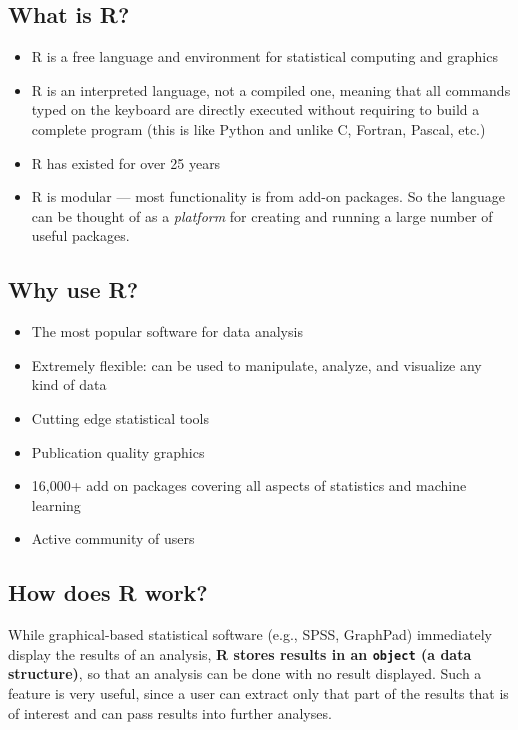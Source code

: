\documentclass[
]{book}
\providecommand{\tightlist}{%
  \setlength{\itemsep}{0pt}\setlength{\parskip}{0pt}}
\begin{document}
\hypertarget{what-is-r}{%
\subsection{What is R?}\label{what-is-r}}

\begin{itemize}
\tightlist
\item
  R is a free language and environment for statistical computing and graphics
\item
  R is an interpreted language, not a compiled one, meaning that all commands typed on the keyboard are directly executed without requiring to build a complete program (this is like Python and unlike C, Fortran, Pascal, etc.)
\item
  R has existed for over 25 years
\item
  R is modular --- most functionality is from add-on packages. So the language can be thought of as a \emph{platform} for creating and running a large number of useful packages.
\end{itemize}

\hypertarget{why-use-r}{%
\subsection{Why use R?}\label{why-use-r}}

\begin{itemize}
\tightlist
\item
  The most popular software for data analysis
\item
  Extremely flexible: can be used to manipulate, analyze, and visualize any kind of data
\item
  Cutting edge statistical tools
\item
  Publication quality graphics
\item
  16,000+ add on packages covering all aspects of statistics and machine learning
\item
  Active community of users
\end{itemize}

\hypertarget{how-does-r-work}{%
\subsection{How does R work?}\label{how-does-r-work}}

While graphical-based statistical software (e.g., SPSS, GraphPad) immediately display the results of an analysis, \textbf{R stores results in an \texttt{object} (a data structure)}, so that an analysis can be done with no result displayed. Such a feature is very useful, since a user can extract only that part of the results that is of interest and can pass results into further analyses.
\end{document}
